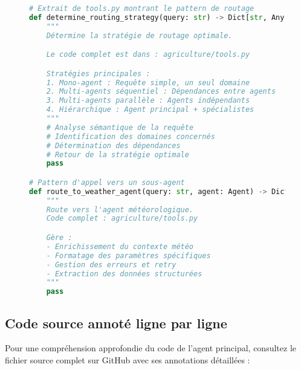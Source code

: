 \begin{figure}[h]
\centering
\begin{lstlisting}[language=Python, caption=Logique de routage intelligente (extrait)]
# Extrait de tools.py montrant le pattern de routage
def determine_routing_strategy(query: str) -> Dict[str, Any]:
    """
    Détermine la stratégie de routage optimale.

    Le code complet est dans : agriculture/tools.py

    Stratégies principales :
    1. Mono-agent : Requête simple, un seul domaine
    2. Multi-agents séquentiel : Dépendances entre agents
    3. Multi-agents parallèle : Agents indépendants
    4. Hiérarchique : Agent principal + spécialistes
    """
    # Analyse sémantique de la requête
    # Identification des domaines concernés
    # Détermination des dépendances
    # Retour de la stratégie optimale
    pass

# Pattern d'appel vers un sous-agent
def route_to_weather_agent(query: str, agent: Agent) -> Dict[str, Any]:
    """
    Route vers l'agent météorologique.
    Code complet : agriculture/tools.py

    Gère :
    - Enrichissement du contexte météo
    - Formatage des paramètres spécifiques
    - Gestion des erreurs et retry
    - Extraction des données structurées
    """
    pass
\end{lstlisting}
\end{figure}

\subsection{Code source annoté ligne par ligne}

Pour une compréhension approfondie du code de l'agent principal, consultez le fichier source complet sur GitHub avec ses annotations détaillées :

